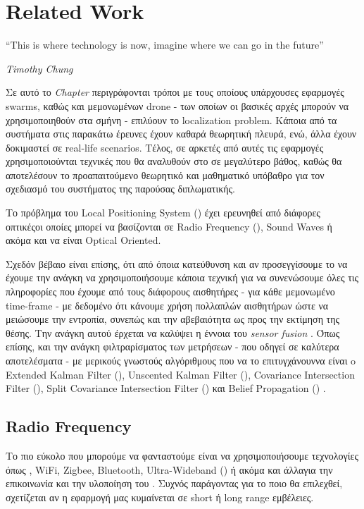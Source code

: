\chapter{Related Work} \label{chap:Chapter2}       
\epigraph{``This is where technology is now, imagine where we can go in the future” }{\textit{Timothy Chung}}

Σε αυτό το \emph{Chapter} περιγράφονται τρόποι με τους οποί\-ους υπάρχουσες εφαρμογές  swarms, καθώς και 
μεμονωμένων drone - των οποίων οι βασικές αρχές μπορούν να χρησιμοποιηθούν στα σμήνη - επιλύουν το localization pro\-blem. Κάποια από τα συστήματα στις 
παρακάτω έρευνες έχουν καθαρά θεωρητική πλευρά, ενώ, άλλα έχουν δοκιμαστεί σε real-life scenarios.
Τέλος, σε α\-ρκε\-τές από αυτές τις εφαρμογές χρησιμοποιούνται τεχνικές που θα αναλυθούν στο 
σε μεγαλύτερο βάθος, καθώς θα αποτελέσουν το προαπαιτούμενο θεωρητικό και μαθηματικό υπόβαθρο για τον σχεδιασμό 
του συστήματος της παρούσας διπλωματικής.

Το πρόβλημα του Local Positioning System () \cite{lps} έχει ερευνηθεί από διάφορες οπτικές\udot οι 
οποίες μπορεί να βασίζονται σε Radio Frequency (), Sound Waves ή ακόμα και να είναι Optical Oriented.

Σχεδόν βέβαιο είναι επίσης, ότι από όποια κατεύθυνση και αν προσεγγίσουμε το  να έχουμε την ανάγκη να 
χρησιμοποιήσουμε κάποια τεχνική για να συνενώσουμε όλες τις πληροφορίες που έχουμε από τους διάφορους αισθητήρες -
για κάθε μεμονωμένο time-frame - με δεδομένο ότι κάνουμε χρήση πολλαπλών αισθητήρων ώστε να μειώσουμε την εντροπία, 
συνεπώς και την αβεβαιότητα ως προς την εκτίμηση της θέσης. 
Την ανάγκη αυτού έρχεται να καλύψει η έννοια του \emph{sensor fusion} \cite{sensor-fusion}. Όπως επίσης, και την 
ανάγκη φιλτραρίσματος των μετρήσεων - που οδηγεί σε καλύτερα αποτε\-λέ\-σμα\-τα - με μερικούς γνωστούς αλγόριθμους 
που να το επιτυγχάνουν\udot να είναι o Extended Kalman Filter (), Unscented Kalman Filter (), 
Covariance Intersection Filter (),  Split  Covariance  Intersection  Filter () και  Belief  
Propagation () \cite{fusion-filters}. 

\section{Radio Frequency}
Το πιο εύκολο που μπορούμε να φανταστούμε είναι να χρησιμοποιήσουμε  τε\-χνο\-λο\-γίες όπως , WiFi, Zigbee, Bluetooth, Ultra-Wideband () ή ακόμα και άλλα\udot για την επικοινωνία και την υλοποίηση του . Συχνός παράγοντας για το ποιο θα επιλεχθεί, σχετίζεται αν η εφαρμογή μας κυμαίνεται σε short ή long range εμβέλειες.


